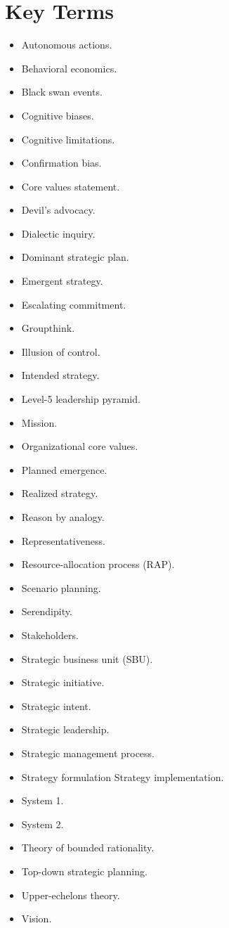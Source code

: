 \documentclass[
]{book}
\providecommand{\tightlist}{%
  \setlength{\itemsep}{0pt}\setlength{\parskip}{0pt}}
\begin{document}
\hypertarget{key-terms-1}{%
\section{Key Terms}\label{key-terms-1}}

\begin{itemize}
\tightlist
\item
  Autonomous actions.
\item
  Behavioral economics.
\item
  Black swan events.
\item
  Cognitive biases.
\item
  Cognitive limitations.
\item
  Confirmation bias.
\item
  Core values statement.
\item
  Devil's advocacy.
\item
  Dialectic inquiry.
\item
  Dominant strategic plan.
\item
  Emergent strategy.
\item
  Escalating commitment.
\item
  Groupthink.
\item
  Illusion of control.
\item
  Intended strategy.
\item
  Level-5 leadership pyramid.
\item
  Mission.
\item
  Organizational core values.
\item
  Planned emergence.
\item
  Realized strategy.
\item
  Reason by analogy.
\item
  Representativeness.
\item
  Resource-allocation process (RAP).
\item
  Scenario planning.
\item
  Serendipity.
\item
  Stakeholders.
\item
  Strategic business unit (SBU).
\item
  Strategic initiative.
\item
  Strategic intent.
\item
  Strategic leadership.
\item
  Strategic management process.
\item
  Strategy formulation Strategy implementation.
\item
  System 1.
\item
  System 2.
\item
  Theory of bounded rationality.
\item
  Top-down strategic planning.
\item
  Upper-echelons theory.
\item
  Vision.
\end{itemize}
\end{document}
